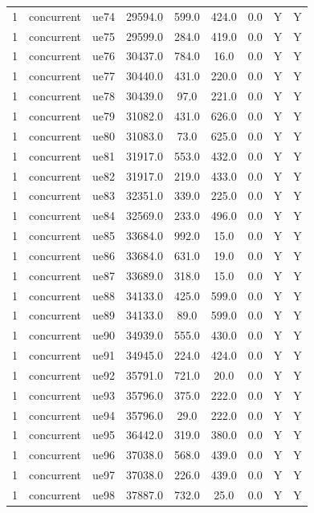\begin{table}[ht]
\begin{tabular}{|c|c|c|c|c|c|c|c|c|}
1 & concurrent & ue74 & 29594.0 & 599.0 & 424.0 & 0.0 & Y & Y \\
1 & concurrent & ue75 & 29599.0 & 284.0 & 419.0 & 0.0 & Y & Y \\
1 & concurrent & ue76 & 30437.0 & 784.0 & 16.0 & 0.0 & Y & Y \\
1 & concurrent & ue77 & 30440.0 & 431.0 & 220.0 & 0.0 & Y & Y \\
1 & concurrent & ue78 & 30439.0 & 97.0 & 221.0 & 0.0 & Y & Y \\
1 & concurrent & ue79 & 31082.0 & 431.0 & 626.0 & 0.0 & Y & Y \\
1 & concurrent & ue80 & 31083.0 & 73.0 & 625.0 & 0.0 & Y & Y \\
1 & concurrent & ue81 & 31917.0 & 553.0 & 432.0 & 0.0 & Y & Y \\
1 & concurrent & ue82 & 31917.0 & 219.0 & 433.0 & 0.0 & Y & Y \\
1 & concurrent & ue83 & 32351.0 & 339.0 & 225.0 & 0.0 & Y & Y \\
1 & concurrent & ue84 & 32569.0 & 233.0 & 496.0 & 0.0 & Y & Y \\
1 & concurrent & ue85 & 33684.0 & 992.0 & 15.0 & 0.0 & Y & Y \\
1 & concurrent & ue86 & 33684.0 & 631.0 & 19.0 & 0.0 & Y & Y \\
1 & concurrent & ue87 & 33689.0 & 318.0 & 15.0 & 0.0 & Y & Y \\
1 & concurrent & ue88 & 34133.0 & 425.0 & 599.0 & 0.0 & Y & Y \\
1 & concurrent & ue89 & 34133.0 & 89.0 & 599.0 & 0.0 & Y & Y \\
1 & concurrent & ue90 & 34939.0 & 555.0 & 430.0 & 0.0 & Y & Y \\
1 & concurrent & ue91 & 34945.0 & 224.0 & 424.0 & 0.0 & Y & Y \\
1 & concurrent & ue92 & 35791.0 & 721.0 & 20.0 & 0.0 & Y & Y \\
1 & concurrent & ue93 & 35796.0 & 375.0 & 222.0 & 0.0 & Y & Y \\
1 & concurrent & ue94 & 35796.0 & 29.0 & 222.0 & 0.0 & Y & Y \\
1 & concurrent & ue95 & 36442.0 & 319.0 & 380.0 & 0.0 & Y & Y \\
1 & concurrent & ue96 & 37038.0 & 568.0 & 439.0 & 0.0 & Y & Y \\
1 & concurrent & ue97 & 37038.0 & 226.0 & 439.0 & 0.0 & Y & Y \\
1 & concurrent & ue98 & 37887.0 & 732.0 & 25.0 & 0.0 & Y & Y \\

\end{tabular}
\end{table}
